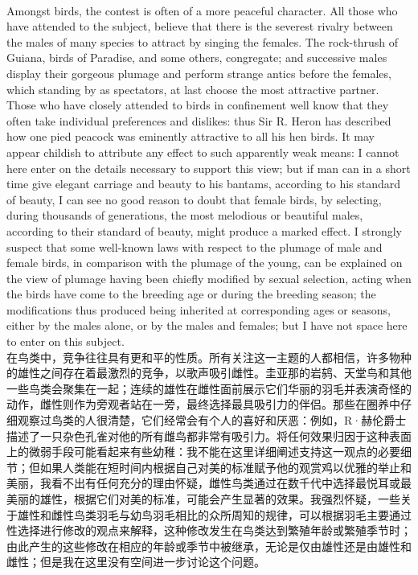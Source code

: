 \documentclass{article}
\begin{document}
\\
Amongst birds, the contest is often of a more peaceful character. All those who have attended to the subject, believe that there is the severest rivalry between the males of many species to attract by singing the females. The rock-thrush of Guiana, birds of Paradise, and some others, congregate; and successive males display their gorgeous plumage and perform strange antics before the females, which standing by as spectators, at last choose the most attractive partner. Those who have closely attended to birds in confinement well know that they often take individual preferences and dislikes: thus Sir R. Heron has described how one pied peacock was eminently attractive to all his hen birds. It may appear childish to attribute any effect to such apparently weak means: I cannot here enter on the details necessary to support this view; but if man can in a short time give elegant carriage and beauty to his bantams, according to his standard of beauty, I can see no good reason to doubt that female birds, by selecting, during thousands of generations, the most melodious or beautiful males, according to their standard of beauty, might produce a marked effect. I strongly suspect that some well-known laws with respect to the plumage of male and female birds, in comparison with the plumage of the young, can be explained on the view of plumage having been chiefly modified by sexual selection, acting when the birds have come to the breeding age or during the breeding season; the modifications thus produced being inherited at corresponding ages or seasons, either by the males alone, or by the males and females; but I have not space here to enter on this subject.\\
在鸟类中，竞争往往具有更和平的性质。所有关注这一主题的人都相信，许多物种的雄性之间存在着最激烈的竞争，以歌声吸引雌性。圭亚那的岩鸫、天堂鸟和其他一些鸟类会聚集在一起；连续的雄性在雌性面前展示它们华丽的羽毛并表演奇怪的动作，雌性则作为旁观者站在一旁，最终选择最具吸引力的伴侣。那些在圈养中仔细观察过鸟类的人很清楚，它们经常会有个人的喜好和厌恶：例如，R·赫伦爵士描述了一只杂色孔雀对他的所有雌鸟都非常有吸引力。将任何效果归因于这种表面上的微弱手段可能看起来有些幼稚：我不能在这里详细阐述支持这一观点的必要细节；但如果人类能在短时间内根据自己对美的标准赋予他的观赏鸡以优雅的举止和美丽，我看不出有任何充分的理由怀疑，雌性鸟类通过在数千代中选择最悦耳或最美丽的雄性，根据它们对美的标准，可能会产生显著的效果。我强烈怀疑，一些关于雄性和雌性鸟类羽毛与幼鸟羽毛相比的众所周知的规律，可以根据羽毛主要通过性选择进行修改的观点来解释，这种修改发生在鸟类达到繁殖年龄或繁殖季节时；由此产生的这些修改在相应的年龄或季节中被继承，无论是仅由雄性还是由雄性和雌性；但是我在这里没有空间进一步讨论这个问题。\\
\end{document}
